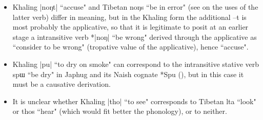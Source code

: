\documentclass[oldfontcommands,oneside,a4paper,11pt]{article}
\newcommand{\ipa}[1]{{\phon #1}} %
\begin{document}
\begin{itemize}
\item Khaling |noŋt| ``accuse" and Tibetan \ipa{noŋs} ``be in error" (see \citealt{hill08moriendi} on the uses of the latter verb) differ in meaning, but in the Khaling form the additional \ipa{--t} is most probably the applicative, so that it is legitimate to posit at an earlier stage a intransitive verb *|noŋ| ``be wrong" derived through the applicative as ``consider to be wrong" (tropative value of the applicative), hence ``accuse".
\item Khaling |pu| ``to dry on smoke" can correspond to the intransitive stative verb \ipa{spɯ} ``be dry" in Japhug and its Naish cognate *Spu (\citealt{jacques.michaud11naish}), but in this case it must be a causative derivation.
\item It is unclear whether Khaling |tho| ``to see" corresponds to Tibetan \ipa{lta} ``look" or \ipa{thos} ``hear" (which would fit better the phonology), or to neither.
\end{itemize}
\end{document}
